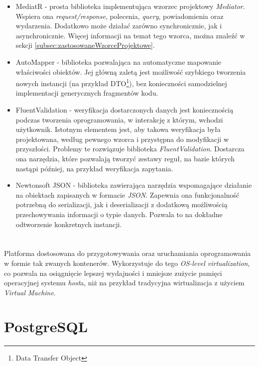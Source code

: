 \begin{itemize}
	\item MediatR - prosta biblioteka implementująca wzorzec projektowy \emph{Mediator}. Wspiera ona \emph{request/response}, polecenia, \emph{query}, powiadomienia oraz wydarzenia. Dodatkowo może działać zarówno synchronicznie, jak i asynchronicznie. Więcej informacji na temat tego wzorca, można znaleźć w sekcji \ref{subsec:zastosowaneWzorceProjektowe}.
	\item AutoMapper - biblioteka pozwalająca na automatyczne mapowanie właściwości obiektów. Jej główną zaletą jest możliwość szybkiego tworzenia nowych instancji (na przykład DTO\footnote{Data Transfer Object}), bez konieczności samodzielnej implementacji generycznych fragmentów kodu.
	\item FluentValidation - weryfikacja dostarczonych danych jest koniecznością podczas tworzenia oprogramowania, w interakcję z którym, wchodzi użytkownik. Istotnym elementem jest, aby takowa weryfikacja była projektowana, według pewnego wzorca i przystępna do modyfikacji w przyszłości. Problemy te rozwiązuje biblioteka \emph{FluentValidation}. Dostarcza ona narzędzia, które pozwalają tworzyć zestawy reguł, na bazie których nastąpi później, na przykład weryfikacja zapytania.
	\item Newtonsoft JSON - biblioteka zawierająca narzędzia wspomagające działanie na obiektach zapisanych w formacie \emph{JSON}. Zapewnia ona funkcjonalność potrzebną do serializacji, jak i deserializacji z dodatkową możliwością przechowywania informacji o typie danych. Pozwala to na dokładne odtworzenie konkretnych instancji.
\end{itemize}

\section{\docker{}}

\par Platforma dostosowana do przygotowywania oraz uruchamiania oprogramowania w formie tak zwanych kontenerów. Wykorzystuje do tego \emph{OS-level virtualization}, co pozwala na osiągnięcie lepszej wydajności i mniejsze zużycie pamięci operacyjnej systemu \emph{host}a, niż na przykład tradycyjna wirtualizacja z użyciem \emph{Virtual Machine}\cite{DOCKER_DOCUMENTATION}.

\section{PostgreSQL}

